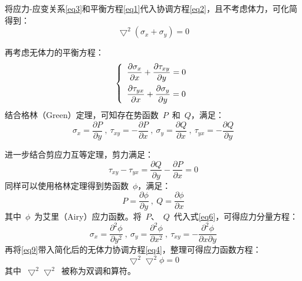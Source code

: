 将应力-应变关系\eqref{eq3}和平衡方程\eqref{eq1}代入协调方程\eqref{eq2}，且不考虑体力，可化简得到：
\begin{equation}\label{eq4}
    \bigtriangledown^2(\sigma_x+\sigma_y) = 0
\end{equation} 

再考虑无体力的平衡方程：
\begin{equation}\label{eq5}
    \left\{
        \begin{array}{l}
            \dfrac{\partial \sigma_x}{\partial x} + \dfrac{\partial \tau_{xy}}{\partial y} = 0\vspace{1ex}\\
            \dfrac{\partial \tau_{yx}}{\partial x} + \dfrac{\partial \sigma_y}{\partial y} = 0
        \end{array}
    \right.
\end{equation} 
结合格林（Green）定理，可知存在势函数~$P$~和~$Q$，满足：
\begin{equation}\label{eq6}
    \sigma_x = \frac{\partial P}{\partial y}~,~\tau_{xy} = -\frac{\partial P}{\partial x}~,~\sigma_y = \frac{\partial Q}{\partial x}~,~\tau_{yx} = -\frac{\partial Q}{\partial y}
\end{equation}  

进一步结合剪应力互等定理，剪力满足：
\begin{equation}\label{eq7}
    \tau_{xy}-\tau_{yx} = \frac{\partial Q}{\partial y}-\frac{\partial P}{\partial x}=0
\end{equation}  
同样可以使用格林定理得到势函数~$\phi$，满足：
\begin{equation}\label{eq8}
    P = \frac{\partial \phi}{\partial y}~,~Q = \frac{\partial \phi}{\partial x}
\end{equation}  
其中~$\phi$~为艾里（Airy）应力函数。将~$P$、~$Q$~代入式\eqref{eq6}，可得应力分量方程：
\begin{equation}\label{eq9}
    \sigma_x = \frac{\partial^2 \phi}{\partial y^2}~,~\sigma_y = \frac{\partial^2 \phi}{\partial x^2}~,~\tau_{xy} = -\frac{\partial^2 \phi}{\partial x \partial y}
\end{equation} 
再将\eqref{eq9}带入简化后的无体力协调方程\eqref{eq4}，整理可得应力函数方程：
\begin{equation}\label{eq10}
    \bigtriangledown^2\bigtriangledown^2 \phi = 0
\end{equation}
其中~$\bigtriangledown^2\bigtriangledown^2$~被称为双调和算符。

